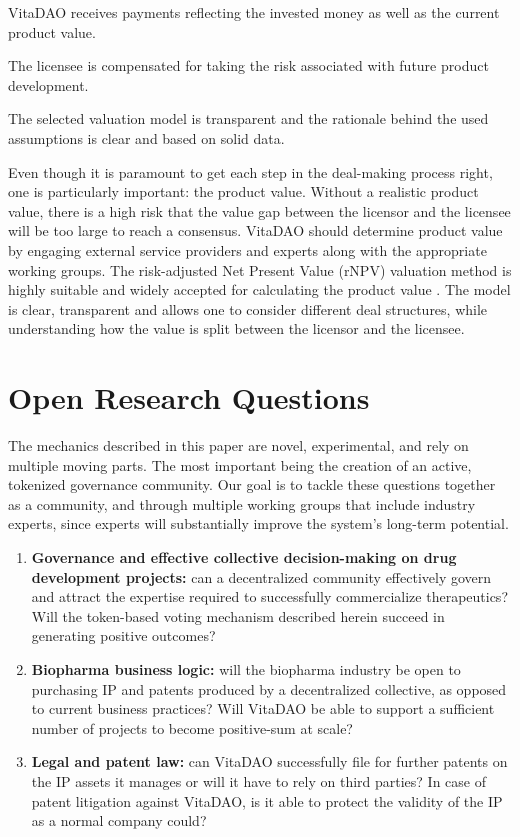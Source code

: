 \documentclass[10pt,letterpaper]{article}
\newenvironment{tight_enumerate}{
\begin{enumerate}
  \setlength{\itemsep}{0pt}
  \setlength{\parskip}{0pt}
}{\end{enumerate}}
\begin{document}
\begin{tight_enumerate}
\item VitaDAO receives payments reflecting the invested money as well as the current product value.
\item The licensee is compensated for taking the risk associated with future product development.
\item The selected valuation model is transparent and the rationale behind the used assumptions is clear and based on solid data.
\end{tight_enumerate}

Even though it is paramount to get each step in the deal-making process right, one is particularly important: the product value. Without a realistic product value, there is a high risk that the value gap between the licensor and the licensee will be too large to reach a consensus. VitaDAO should determine product value by engaging external service providers and experts along with the appropriate working groups. The risk-adjusted Net Present Value (rNPV) valuation method is highly suitable and widely accepted for calculating the product value \citep{PriceBio}. The model is clear, transparent and allows one to consider different deal structures, while understanding how the value is split between the licensor and the licensee.

\section{Open Research Questions}
The mechanics described in this paper are novel, experimental, and rely on multiple moving parts. The most important being the creation of an active, tokenized governance community. Our goal is to tackle these questions together as a community, and through multiple working groups that include industry experts, since experts will substantially improve the system’s long-term potential.

\begin{enumerate}
\item \textbf{Governance and effective collective decision-making on drug development projects:} can a decentralized community effectively govern and attract the expertise required to successfully commercialize therapeutics? Will the token-based voting mechanism described herein succeed in generating positive outcomes?  
\item \textbf{Biopharma business logic:} will the biopharma industry be open to purchasing IP and patents produced by a decentralized collective, as opposed to current business practices? Will VitaDAO be able to support a sufficient number of projects to become positive-sum at scale?
\item \textbf{Legal and patent law:} can VitaDAO successfully file for further patents on the IP assets it manages or will it have to rely on third parties? In case of patent litigation against VitaDAO, is it able to protect the validity of the IP as a normal company could?
\end{enumerate}
\end{document}
